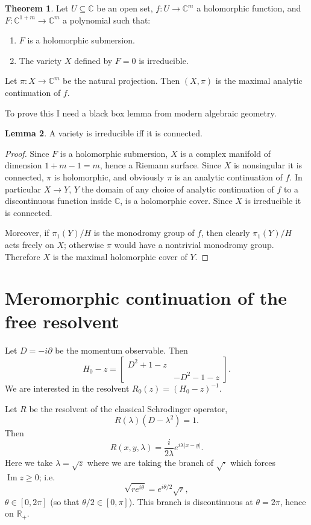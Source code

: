 \documentclass[12pt]{report}
\newcommand{\RR}{\mathbb{R}}
\newcommand{\CC}{\mathbb{C}}
\renewcommand{\Im}{\operatorname{Im}}
\theoremstyle{definition}
\newtheorem{theorem}{Theorem}[chapter]
\newtheorem{lemma}[theorem]{Lemma}
\begin{document}
\begin{theorem}
Let $U \subseteq \CC$ be an open set, $f: U \to \CC^m$ a holomorphic function, and $F: \CC^{1 + m} \to \CC^m$ a polynomial such that:
\begin{enumerate}
\item $F$ is a holomorphic submersion.
\item The variety $X$ defined by $F = 0$ is irreducible.
\end{enumerate}
Let $\pi: X \to \CC^m$ be the natural projection. Then $(X, \pi)$ is the maximal analytic continuation of $f$.
\end{theorem}
To prove this I need a black box lemma from modern algebraic geometry.
\begin{lemma}
A variety is irreducible iff it is connected.
\end{lemma}
\begin{proof}
Since $F$ is a holomorphic submersion, $X$ is a complex manifold of dimension $1+m - 1 = m$, hence a Riemann surface.
Since $X$ is nonsingular it is connected, $\pi$ is holomorphic, and obviously $\pi$ is an analytic continuation of $f$.
In particular $X \to Y$, $Y$ the domain of any choice of analytic continuation of $f$ to a discontinuous function inside $\CC$, is a holomorphic cover.
Since $X$ is irreducible it is connected.

Moreover, if $\pi_1(Y)/H$ is the monodromy group of $f$, then clearly $\pi_1(Y)/H$ acts freely on $X$; otherwise $\pi$ would have a nontrivial monodromy group. Therefore $X$ is the maximal holomorphic cover of $Y$.
\end{proof}



\section{Meromorphic continuation of the free resolvent}
Let $D = -i\partial$ be the momentum observable.
Then
$$H_0 - z = \begin{bmatrix}
D^2 + 1 - z\\
&-D^2 - 1 -z
\end{bmatrix}.$$
We are interested in the resolvent $R_0(z) = (H_0 - z)^{-1}$.

Let $R$ be the resolvent of the classical Schrodinger operator,
$$R(\lambda)(D - \lambda^2) = 1.$$
Then
$$R(x, y, \lambda) = \frac{i}{2\lambda} e^{i\lambda|x-y|}.$$
Here we take $\lambda = \sqrt z$ where we are taking the branch of $\sqrt\cdot$ which forces $\Im z \geq 0$; i.e.
$$\sqrt{re^{i\theta}} = e^{i\theta/2}\sqrt r,$$
$\theta \in [0, 2\pi]$ (so that $\theta/2 \in [0, \pi]$). This branch is discontinuous at $\theta = 2\pi$, hence on $\RR_+$.
\end{document}
